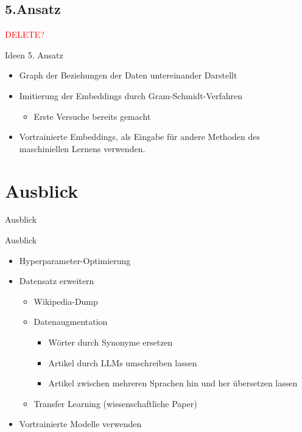 \documentclass[aspectratio=169]{beamer} %
\begin{document}
\subsection{5.Ansatz}
\begin{frame}
    \textcolor{red}{DELETE?}
    \begin{block}{Ideen 5. Ansatz}
        \begin{itemize}
            \item Graph der Beziehungen der Daten untereinander Darstellt
            \item Imitierung der Embeddings durch Gram-Schmidt-Verfahren
                  \begin{itemize}
                      \item Erste Versuche bereits gemacht
                  \end{itemize}
            \item Vortrainierte Embeddings, als Eingabe f\"ur andere Methoden des maschiniellen Lernens verwenden.
        \end{itemize}
    \end{block}
\end{frame}

\section{Ausblick}
\begin{frame}{Ausblick}
    \begin{block}{Ausblick}
        \begin{itemize}
            \item Hyperparameter-Optimierung

            \item Datensatz erweitern
            \begin{itemize}
                \item Wikipedia-Dump
                
                \item Datenaugmentation
                \begin{itemize}
                    \item W\"orter durch Synonyme ersetzen

                    \item Artikel durch LLMs umschreiben lassen

                    \item Artikel zwischen mehreren Sprachen hin und her \"ubersetzen lassen
                \end{itemize}
                
                \item Transfer Learning (wissenschaftliche Paper)
            \end{itemize}

            \item Vortrainierte Modelle verwenden
        \end{itemize}
    \end{block}
\end{frame}
\end{document}

